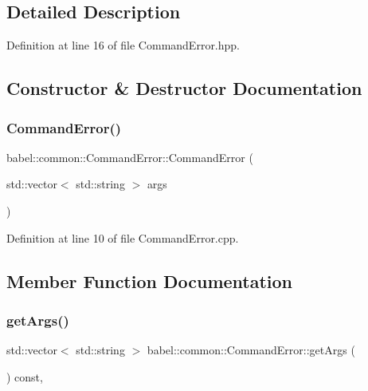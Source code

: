 \subsection{Detailed Description}


Definition at line 16 of file Command\+Error.\+hpp.



\subsection{Constructor \& Destructor Documentation}
\mbox{\label{classbabel_1_1common_1_1_command_error_a536f3b4e7ccf1a435c8b253a93955d35}} 
\subsubsection{\texorpdfstring{Command\+Error()}{CommandError()}}
{\footnotesize\ttfamily babel\+::common\+::\+Command\+Error\+::\+Command\+Error (\begin{DoxyParamCaption}\item[{std\+::vector$<$ std\+::string $>$}]{args }\end{DoxyParamCaption})}



Definition at line 10 of file Command\+Error.\+cpp.



\subsection{Member Function Documentation}
\mbox{\label{classbabel_1_1common_1_1_command_error_af93f8813d74db60501ee4d079e983218}} 
\subsubsection{\texorpdfstring{get\+Args()}{getArgs()}}
{\footnotesize\ttfamily std\+::vector$<$ std\+::string $>$ babel\+::common\+::\+Command\+Error\+::get\+Args (\begin{DoxyParamCaption}{ }\end{DoxyParamCaption}) const\hspace{0.3cm}{\ttfamily [override]}, {\ttfamily [virtual]}}



